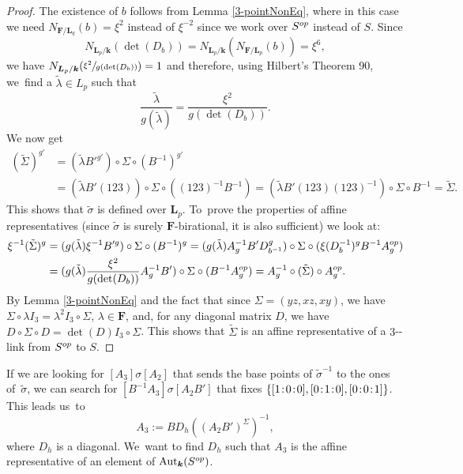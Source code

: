 \documentclass[10pt,a4paper]{amsart}
\providecommand{\nobreakdash}{\nobreak\hbox{-}}
\newcommand{\op}{\textup{op}}
\newcommand{\sep}{\mkern2mu{:}\mkern2mu}
\theoremstyle{definition}
\newcommand{\kk}{{\boldsymbol{k}}}
\newcommand{\FF}{{\boldsymbol{F}}}
\newcommand{\LL}{{\boldsymbol{L}}}
\DeclareMathOperator{\Aut}{Aut}
\begin{document}
\begin{proof}
The existence of $b$ follows from Lemma \ref{3-pointNonEq}, where in this case we need $N_{\FF/\LL_q}(b) = \xi^2$ instead of $\xi^{-2}$ since we work over $S^{\op}$ instead of $S$. Since
\[
N_{\LL_p / \kk}(\det(D_b)) = N_{\LL_p / \kk}(N_{\FF/\LL_p}(b)) = \xi^6,
\]
we have $N_{\LL_p / \kk}(\sfrac{\xi^2}{g(\det(D_b))}) = 1$ and therefore, using Hilbert's Theorem 90, we~find a $\tilde \lambda \in L_p$ such that
\[
\frac{\tilde \lambda}{g(\tilde \lambda)} = \frac{\xi^2}{g(\det(D_b))}.
\]
We now get\vspace*{-3pt}
\begin{align*}
(\tilde \Sigma)^{g'} &= (\tilde \lambda B'^{g'}) \circ \Sigma \circ (B^{-1})^{g'}
\\
&= (\tilde \lambda B' (123)) \circ \Sigma \circ ((123)^{-1} B^{-1}) = (\tilde \lambda B' (123) (123)^{-1}) \circ \Sigma \circ B^{-1} = \tilde \Sigma.
\end{align*}
This shows that $\tilde \sigma$ is defined over $\LL_p$. To~prove the properties of affine representatives (since $\tilde \sigma$ is surely $\FF$-birational, it is also sufficient) we look at:\vspace*{-3pt}
\begin{align*}
\xi^{-1}(\tilde \Sigma)^g &= (g(\tilde \lambda)\xi^{-1} B'^g) \circ \Sigma \circ (B^{-1})^g = (g(\tilde \lambda) A_g^{-1} B' D_{b^{-1}}^g) \circ \Sigma \circ (\xi (D_{b}^{-1})^g B^{-1} A_g^{\op})
\\
&= (g(\tilde \lambda) \frac{\xi^2}{g(\det(D_b))} A_g^{-1} B') \circ \Sigma \circ (B^{-1}A_g^{\op}) = A_g^{-1} \circ (\tilde \Sigma) \circ A_g^{\op}.
\end{align*}
By Lemma \ref{3-pointNonEq} and the fact that since $\Sigma = (yz,xz, xy)$, we have $\Sigma \circ \lambda I_3 = \lambda^2I_3 \circ \Sigma$, $\lambda \in \FF$, and, for any diagonal matrix $D$, we have $D \circ \Sigma \circ D = \det(D) I_3 \circ \Sigma$. This shows that $\tilde \Sigma$ is an affine representative of a $3$\nobreakdash-link from $S^{\op}$ to $S$.
\end{proof}

If we are looking for $[A_3] \sigma [A_2]$ that sends the base points of $\tilde \sigma^{-1}$ to the ones of~$\tilde \sigma$, we can search for $[B^{-1} A_3] \sigma [A_2 B']$ that fixes $\{ [1\sep 0\sep 0], [0\sep 1\sep 0], [0\sep 0\sep 1]\}$. This leads us~to\vspace*{-3pt}
\[
A_3 := B D_h ((A_2B')^{\Sigma})^{-1},
\]
where $D_h$ is a diagonal. We~want to find $D_h$ such that $A_3$ is the affine representative of an element of $\Aut_{\kk}(S^{\op})$.
\end{document}
